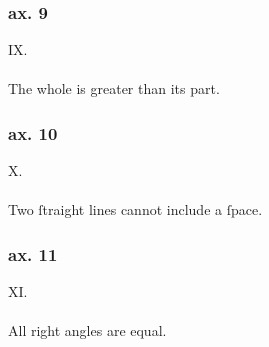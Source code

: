 \begin{minipage}{0.165\textwidth}
  \phantom{}
\end{minipage}%
\begin{minipage}{0.67\textwidth}
  \subsubsection{ax. 9}
  \begin{center}
    IX.\label{ax9}\\
    \hfill\\
    The whole is greater than its part.\\
  \end{center}
  \subsubsection{ax. 10}
  \begin{center}
    X.\label{ax10}\\
    \hfill\\
    Two ſtraight lines cannot include a ſpace.\\
  \end{center}
  \subsubsection{ax. 11}
  \begin{center}
    XI.\label{ax11}\\
    \hfill\\
    All right angles are equal.\\
  \end{center}
\end{minipage}%
\begin{minipage}{0.165\textwidth}
  \phantom{}
\end{minipage}

\pagebreak

